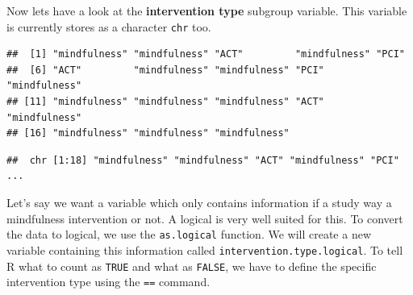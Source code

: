 \documentclass[]{book}
\newenvironment{Shaded}{\begin{snugshade}}{\end{snugshade}}
\newcommand{\DataTypeTok}[1]{\textcolor[rgb]{0.13,0.29,0.53}{#1}}
\newcommand{\KeywordTok}[1]{\textcolor[rgb]{0.13,0.29,0.53}{\textbf{#1}}}
\newcommand{\NormalTok}[1]{#1}
\newcommand{\OperatorTok}[1]{\textcolor[rgb]{0.81,0.36,0.00}{\textbf{#1}}}
\newcommand{\StringTok}[1]{\textcolor[rgb]{0.31,0.60,0.02}{#1}}
\begin{document}
Now lets have a look at the \textbf{intervention type} subgroup variable. This variable is currently stores as a character \texttt{chr} too.

\begin{Shaded}
\end{Shaded}

\begin{verbatim}
##  [1] "mindfulness" "mindfulness" "ACT"         "mindfulness" "PCI"        
##  [6] "ACT"         "mindfulness" "mindfulness" "PCI"         "mindfulness"
## [11] "mindfulness" "mindfulness" "mindfulness" "ACT"         "mindfulness"
## [16] "mindfulness" "mindfulness" "mindfulness"
\end{verbatim}

\begin{Shaded}
\end{Shaded}

\begin{verbatim}
##  chr [1:18] "mindfulness" "mindfulness" "ACT" "mindfulness" "PCI" ...
\end{verbatim}

Let's say we want a variable which only contains information if a study way a mindfulness intervention or not. A logical is very well suited for this. To convert the data to logical, we use the \texttt{as.logical} function. We will create a new variable containing this information called \texttt{intervention.type.logical}. To tell R what to count as \texttt{TRUE} and what as \texttt{FALSE}, we have to define the specific intervention type using the \texttt{==} command.

\begin{Shaded}
\end{Shaded}
\end{document}
